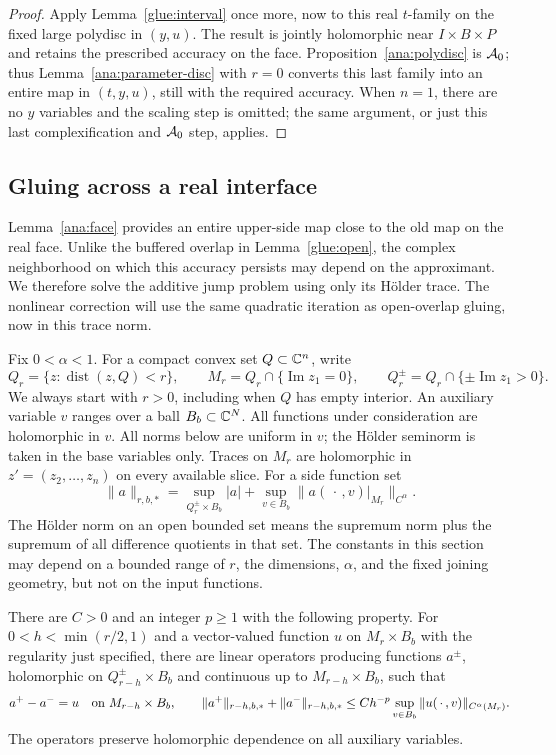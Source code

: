 \begin{proof}
Apply Lemma~\ref{glue:interval} once more, now to this real
\(t\)-family on the fixed large polydisc in \((y,u)\).
The result is jointly holomorphic near
\(I\times B\times P\) and retains the prescribed accuracy on
the face.  Proposition~\ref{ana:polydisc} is \({\cal A}_0\);
thus Lemma~\ref{ana:parameter-disc} with \(r=0\) converts this
last family into an entire map in \((t,y,u)\), still with the
required accuracy.
When \(n=1\), there are no \(y\) variables and the scaling
step is omitted; the same argument, or just this last
complexification and \({\cal A}_0\) step, applies.
\end{proof}

\subsection{Gluing across a real interface}

Lemma~\ref{ana:face} provides an entire upper-side map close to the
old map on the real face. Unlike the buffered overlap in
Lemma~\ref{glue:open}, the complex neighborhood on which this
accuracy persists may depend on the approximant. We therefore solve
the additive jump problem using only its H\"older trace. The
nonlinear correction will use the same quadratic iteration as
open-overlap gluing, now in this trace norm.

Fix $0<\alpha<1$. For a compact convex set $Q\subset\mathbb C^n$, write
\[
 Q_r=\{z:\operatorname{dist}(z,Q)<r\},\qquad
 M_r=Q_r\cap\{\operatorname{Im}z_1=0\},\qquad
 Q_r^\pm=Q_r\cap\{\pm\operatorname{Im}z_1>0\}.
\]
We always start with $r>0$, including when $Q$ has empty interior.
An auxiliary variable $v$ ranges over a ball $B_b\subset\mathbb C^N$.
All functions under consideration are holomorphic in $v$. All norms
below are uniform in $v$; the H\"older seminorm is taken in the
base variables only. Traces on $M_r$ are holomorphic in
$z'=(z_2,\ldots,z_n)$ on every available slice. For a side function set
\[
 \|a\|_{r,b,*}=\sup_{Q_r^\pm\times B_b}|a|
       +\sup_{v\in B_b}\|a(\,\cdot\,,v)|_{M_r}\|_{C^\alpha}.
\]
The H\"older norm on an open bounded set means the supremum norm plus
the supremum of all difference quotients in that set. The constants in
this section may depend on a bounded range of $r$, the dimensions,
$\alpha$, and the fixed joining geometry, but not on the input functions.

\begin{lemma}\label{glue:linear-trace}
There are $C>0$ and an integer $p\geq1$ with the following property.
For $0<h<\min(r/2,1)$ and a vector-valued function $u$ on
$M_r\times B_b$ with the regularity just specified, there are linear
operators producing functions $a^\pm$, holomorphic on
$Q_{r-h}^\pm\times B_b$ and continuous up to $M_{r-h}\times B_b$, such that
\[
 a^+-a^-=u\quad\hbox{on }M_{r-h}\times B_b,
 \qquad
 \|a^+\|_{r-h,b,*}+\|a^-\|_{r-h,b,*}
       \leq Ch^{-p}\sup_{v\in B_b}\|u(\,\cdot\,,v)\|_{C^\alpha(M_r)}.
\]
The operators preserve holomorphic dependence on all auxiliary variables.
\end{lemma}

